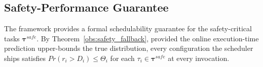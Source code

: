 
    \subsection{Safety-Performance Guarantee}
    \label{section: real_sp_guarantee}
    The framework provides a formal schedulability guarantee for the
    safety-critical tasks $\boldsymbol{\tau}^{safe}$.
    By Theorem~\ref{obs:safety_fallback}, provided the online execution-time
    prediction upper-bounds the true distribution, every configuration the
    scheduler ships satisfies $Pr(r_i > D_i) \leq \Theta_i$ for each
    $\tau_i \in \boldsymbol{\tau}^{safe}$ at every invocation.

